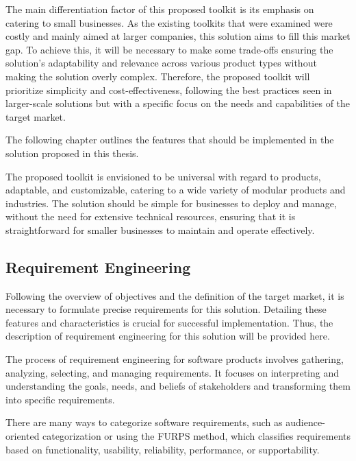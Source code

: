 The main differentiation factor of this proposed toolkit is its emphasis on catering to small businesses. As the existing toolkits that were examined were costly and mainly aimed at larger companies, this solution aims to fill this market gap. To achieve this, it will be necessary to make some trade-offs ensuring the solution's adaptability and relevance across various product types without making the solution overly complex. Therefore, the proposed toolkit will prioritize simplicity and cost-effectiveness, following the best practices seen in larger-scale solutions but with a specific focus on the needs and capabilities of the target market.

The following chapter outlines the features that should be implemented in the solution proposed in this thesis.
 
The proposed toolkit is envisioned to be universal with regard to products, adaptable, and customizable, catering to a wide variety of modular products and industries. The solution should be simple for businesses to deploy and manage, without the need for extensive technical resources, ensuring that it is straightforward for smaller businesses to maintain and operate effectively.

\subsection{Requirement Engineering} \label{section:requirements}

Following the overview of objectives and the definition of the target market, it is necessary to formulate precise requirements for this solution. Detailing these features and characteristics is crucial for successful implementation. Thus, the description of requirement engineering for this solution will be provided here.

The process of requirement engineering for software products involves gathering, analyzing, selecting, and managing requirements. It focuses on interpreting and understanding the goals, needs, and beliefs of stakeholders and transforming them into specific requirements.~\cite{Aurum2005}

There are many ways to categorize software requirements, such as audience-oriented categorization or using the FURPS method, which classifies requirements based on functionality, usability, reliability, performance, or supportability.~\cite{Stephens2023}

